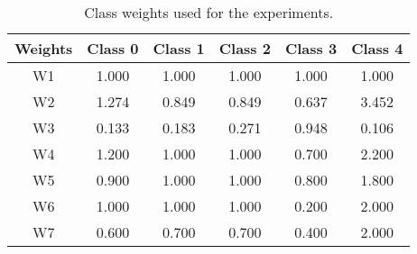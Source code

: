 \begin{table}[ht]
    \centering
        \begin{tabular}{cccccc}
        \hline
        \textbf{Weights} & \textbf{Class 0} & \textbf{Class 1} & \textbf{Class 2} & \textbf{Class 3} & \textbf{Class 4} \\ \hline
        W1                     & 1.000            & 1.000            & 1.000            & 1.000            & 1.000            \\
        W2                     & 1.274            & 0.849            & 0.849            & 0.637            & 3.452            \\
        W3                     & 0.133            & 0.183            & 0.271            & 0.948            & 0.106            \\
        W4                     & 1.200            & 1.000            & 1.000            & 0.700            & 2.200            \\
        W5                     & 0.900            & 1.000            & 1.000            & 0.800            & 1.800            \\
        W6                     & 1.000            & 1.000            & 1.000            & 0.200            & 2.000            \\
        W7                     & 0.600            & 0.700            & 0.700            & 0.400            & 2.000            \\ \hline
        \end{tabular}
    \caption{Class weights used for the experiments.}
    \label{tab:class_weights}
\end{table}